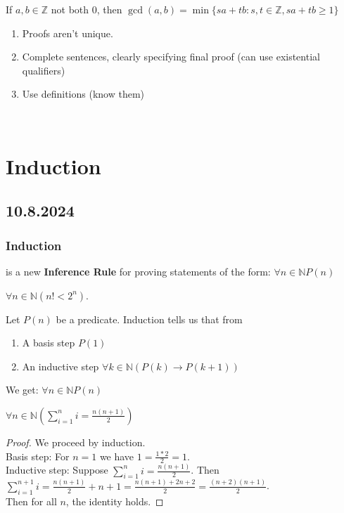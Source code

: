 \documentclass[11pt]{scrartcl}
\begin{document}
\begin{corollary}
    If $a, b \in \mathbb{Z}$ not both $0$, then $\gcd(a, b) = \min\{sa + tb : s, t \in \mathbb{Z}, sa + tb \geq 1\}$
\end{corollary}
\begin{remark}
    \begin{enumerate}
        \item Proofs aren't unique. 
        \item Complete sentences, clearly specifying final proof (can use existential qualifiers)
        \item Use definitions (know them)
    \end{enumerate}
\end{remark}
\noindent
\Line
\\
\section{Induction}
\subsection{10.8.2024}
\subsubsection{Induction}
 is a new \textbf{Inference Rule} for proving statements of the form: $\forall n \in \mathbb{N} P(n)$
\begin{example}
    $\forall n \in \mathbb{N} (n! < 2^n)$.\\
\end{example}
\begin{definition}
    Let $P(n)$ be a predicate.  Induction tells us that from \begin{enumerate}
        \item A basis step $P(1)$
        \item An inductive step $\forall k \in \mathbb{N} (P(k) \rightarrow P(k+1))$
    \end{enumerate}
    We get: $\forall n\in \mathbb{N} P(n)$
\end{definition}
\begin{proposition}
    $\forall n \in \mathbb{N} (\sum_{i=1}^{n} i = \frac{n(n+1)}{2})$
\end{proposition}
\begin{proof}
    We proceed by induction. \\
    Basis step: For $n=1$ we have $1 = \frac{1*2}{2} = 1$. \\
    Inductive step: Suppose $\sum_{i=1}^n i= \frac{n(n+1)}{2}$.  Then $\sum_{i=1}^{n+1} i = \frac{n(n+1)}{2} + n + 1 = \frac{n(n+1) + 2n + 2}{2} = \frac{(n+2)(n+1)}{2}$.\\
    Then for all $n$, the identity holds.
\end{proof}
\end{document}
